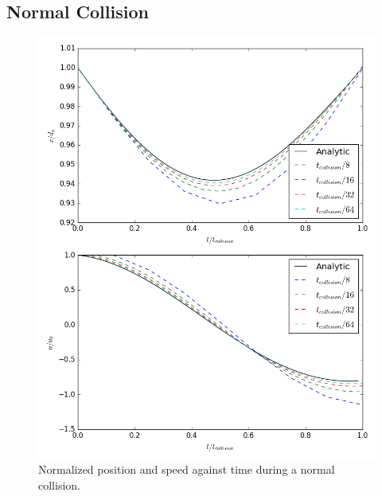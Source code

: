 \documentclass[10pt,a4paper,titlepage]{report}
\begin{document}
\subsection{Normal Collision}
\begin{figure}[!htb]
\centering
\includegraphics[scale=0.5]{figures/python_verification/normal_force_verification.png}
\caption{Normalized position and speed against time during a normal collision.}
\label{fig:python_normal_force_verification}
\end{figure}
\end{document}
